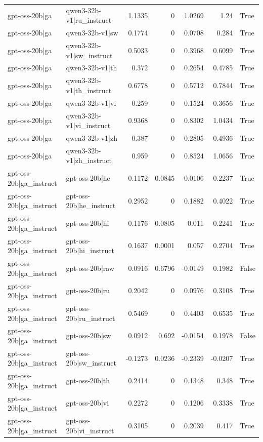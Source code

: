 \begin{table}
\begin{tabular}{l l r r r r l}
gpt-oss-20b|ga & qwen3-32b-v1|ru_instruct & 1.1335 & 0 & 1.0269 & 1.24 & True \\
gpt-oss-20b|ga & qwen3-32b-v1|sw & 0.1774 & 0 & 0.0708 & 0.284 & True \\
gpt-oss-20b|ga & qwen3-32b-v1|sw_instruct & 0.5033 & 0 & 0.3968 & 0.6099 & True \\
gpt-oss-20b|ga & qwen3-32b-v1|th & 0.372 & 0 & 0.2654 & 0.4785 & True \\
gpt-oss-20b|ga & qwen3-32b-v1|th_instruct & 0.6778 & 0 & 0.5712 & 0.7844 & True \\
gpt-oss-20b|ga & qwen3-32b-v1|vi & 0.259 & 0 & 0.1524 & 0.3656 & True \\
gpt-oss-20b|ga & qwen3-32b-v1|vi_instruct & 0.9368 & 0 & 0.8302 & 1.0434 & True \\
gpt-oss-20b|ga & qwen3-32b-v1|zh & 0.387 & 0 & 0.2805 & 0.4936 & True \\
gpt-oss-20b|ga & qwen3-32b-v1|zh_instruct & 0.959 & 0 & 0.8524 & 1.0656 & True \\
gpt-oss-20b|ga_instruct & gpt-oss-20b|he & 0.1172 & 0.0845 & 0.0106 & 0.2237 & True \\
gpt-oss-20b|ga_instruct & gpt-oss-20b|he_instruct & 0.2952 & 0 & 0.1882 & 0.4022 & True \\
gpt-oss-20b|ga_instruct & gpt-oss-20b|hi & 0.1176 & 0.0805 & 0.011 & 0.2241 & True \\
gpt-oss-20b|ga_instruct & gpt-oss-20b|hi_instruct & 0.1637 & 0.0001 & 0.057 & 0.2704 & True \\
gpt-oss-20b|ga_instruct & gpt-oss-20b|raw & 0.0916 & 0.6796 & -0.0149 & 0.1982 & False \\
gpt-oss-20b|ga_instruct & gpt-oss-20b|ru & 0.2042 & 0 & 0.0976 & 0.3108 & True \\
gpt-oss-20b|ga_instruct & gpt-oss-20b|ru_instruct & 0.5469 & 0 & 0.4403 & 0.6535 & True \\
gpt-oss-20b|ga_instruct & gpt-oss-20b|sw & 0.0912 & 0.692 & -0.0154 & 0.1978 & False \\
gpt-oss-20b|ga_instruct & gpt-oss-20b|sw_instruct & -0.1273 & 0.0236 & -0.2339 & -0.0207 & True \\
gpt-oss-20b|ga_instruct & gpt-oss-20b|th & 0.2414 & 0 & 0.1348 & 0.348 & True \\
gpt-oss-20b|ga_instruct & gpt-oss-20b|vi & 0.2272 & 0 & 0.1206 & 0.3338 & True \\
gpt-oss-20b|ga_instruct & gpt-oss-20b|vi_instruct & 0.3105 & 0 & 0.2039 & 0.417 & True \\

\end{tabular}
\end{table}

